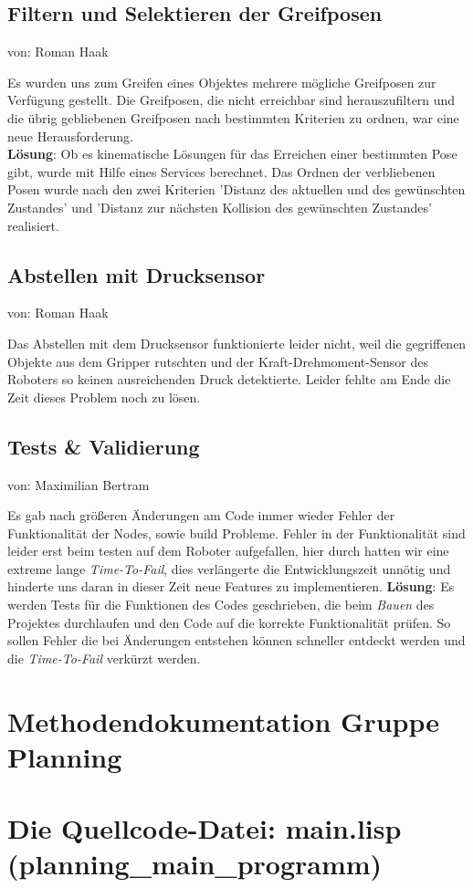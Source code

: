 \documentclass{suturo}
\makeatletter
\newcommand{\chapterauthor}[1]{%
  {\parindent0pt\vspace*{-27pt}%
  \linespread{0}\small\begin{flushright}von: #1\end{flushright}%
  \par\nobreak\vspace*{0pt}}
  \@afterheading%
}
\makeatother
\begin{document}
\subsection{Filtern und Selektieren der Greifposen}
\chapterauthor{Roman Haak}
Es wurden uns zum Greifen eines Objektes mehrere mögliche Greifposen zur Verfügung gestellt. Die Greifposen, die nicht erreichbar sind herauszufiltern und die übrig gebliebenen Greifposen nach bestimmten Kriterien zu ordnen, war eine neue Herausforderung.\\
\textbf{Lösung}: Ob es kinematische Lösungen für das Erreichen einer bestimmten Pose gibt, wurde mit Hilfe eines Services berechnet. Das Ordnen der verbliebenen Posen wurde nach den zwei Kriterien 'Distanz des aktuellen und des gewünschten Zustandes' und 'Distanz zur nächsten Kollision des gewünschten Zustandes' realisiert.

\subsection{Abstellen mit Drucksensor}
\chapterauthor{Roman Haak}
Das Abstellen mit dem Drucksensor funktionierte leider nicht, weil die gegriffenen Objekte aus dem Gripper rutschten und der Kraft-Drehmoment-Sensor des Roboters so keinen ausreichenden Druck detektierte. Leider fehlte am Ende die Zeit dieses Problem noch zu lösen.

\subsection{Tests \& Validierung}
\chapterauthor{Maximilian Bertram}
Es gab nach größeren Änderungen am Code immer wieder Fehler der Funktionalität der Nodes, sowie build Probleme.
Fehler in der Funktionalität sind leider erst beim testen auf dem Roboter aufgefallen, hier durch hatten wir eine extreme lange \textit{Time-To-Fail}, dies verlängerte die Entwicklungszeit unnötig und hinderte uns daran in dieser Zeit neue Features zu implementieren.
\textbf{Lösung}: Es werden Tests für die Funktionen des Codes geschrieben, die beim \textit{Bauen} des Projektes durchlaufen und den Code auf die korrekte Funktionalität prüfen. So sollen Fehler die bei Änderungen entstehen können schneller entdeckt werden und die \textit{Time-To-Fail} verkürzt werden.

\section{Methodendokumentation Gruppe Planning}
\section{Die Quellcode-Datei: main.lisp (planning\_main\_programm)}
\end{document}
